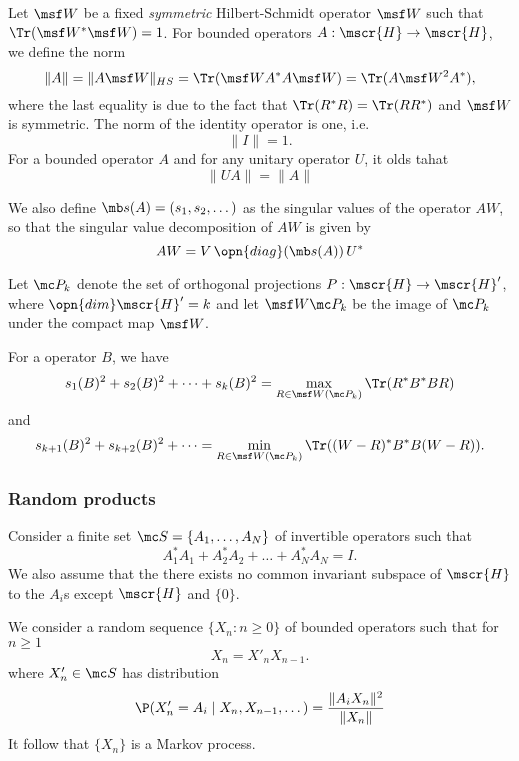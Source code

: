 \documentclass[11pt]{scrartcl}
\renewcommand{\H}{\mscr{H}}
\theoremstyle{plain} %
\theoremstyle{definition}
\begin{document}
Let $\W$ be a fixed \emph{symmetric} Hilbert-Schmidt operator $\W$ such that
$\Tr(\W^*\W)=1$. For bounded operators $A:\H \to \H$, we
define the norm 
\begin{equation}\label{normdef}
\| A \| = \| A\W \|_{HS}= \Tr( \W A^* A \W ) = \Tr(A\W^2 A^*),
\end{equation}
where the last equality is due to the fact that $\Tr(R^* R)=\Tr(RR^*)$
and $\W$ is symmetric. The norm of the identity operator is one, i.e.\ 
\begin{equation}
    \| I \| = 1. \label{normunit}
\end{equation}
For a bounded operator $A$ and for any unitary operator $U$, it olds tahat
\begin{equation}
    \| UA \| = \| A \|
\end{equation}


We also define $\mb s(A) = (s_1,s_2,\dots)$ as the singular
values of the operator $AW$, so that the singular value decomposition
of $AW$ is given by
\begin{equation}\label{sigmadef}
AW = V \, \opn{diag}(\mb s(A)) \, U^*
\end{equation}

Let $\mc P_k$ denote the set of orthogonal projections $P:\H\to
\H'$, where $\opn{dim} \H' = k$ and let $\W \mc P_k$ be the image of
$\mc P_k$ under the compact map $\W$.
\begin{lemma}\label{maxlemma}
  For a operator $B$, we have 
  $$ s_1(B)^2 + s_2(B)^2 + \dots + s_k(B)^2 = 
    \max_{R\in \W(\mc P_k)} \Tr( R^* B^* B R) $$
  and 
  $$ s_{k+1}(B)^2 + s_{k+2}(B)^2 + \dots = 
    \min_{R\in \W(\mc P_k)} \Tr( (W-R)^* B^* B (W-R)). $$
\end{lemma}

\subsubsection{Random products}

Consider a finite set $\mc S=\{A_1,\dots,A_N\}$ of invertible
operators such that 
\begin{equation}\label{eqid}
A_1^*A_1 + A_2^* A_2 + \dots + A_N^*A_N = I.
\end{equation}
We also assume that the there exists no common invariant subspace of $\H$ to the
$A_i$s except $\H$ and $\{0\}$. 

We consider a random sequence $\{ X_n: n\geq0 \}$ 
of bounded operators such that for $n\geq 1$
$$ X_n = X'_n X_{n-1}. $$
where $X'_n\in \mc S$ has distribution
$$ \P(X'_n=A_i\mid X_n,X_{n-1},\dots) = \frac{\|A_iX_n\|^2}{\|X_n\|} $$
It follow that $\{X_n\}$ is a Markov process. 
\end{document}
